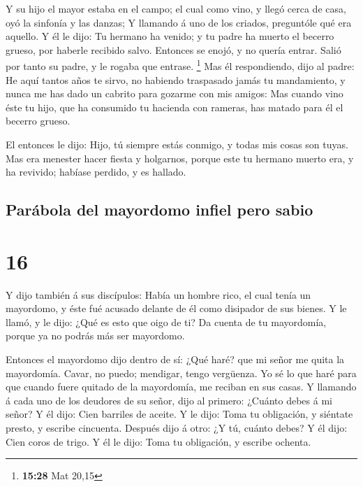  Y su hijo el mayor estaba en el campo; el cual como
vino, y llegó cerca de casa, oyó la sinfonía y las danzas;
 Y llamando á uno de los criados, preguntóle qué era
aquello.  Y él le dijo: Tu hermano ha venido; y tu padre
ha muerto el becerro grueso, por haberle recibido salvo. 
Entonces se enojó, y no quería entrar. Salió por tanto su padre, y le
rogaba que entrase. \footnote{\textbf{15:28} Mat 20,15} 
Mas él respondiendo, dijo al padre: He aquí tantos años te sirvo, no
habiendo traspasado jamás tu mandamiento, y nunca me has dado un cabrito
para gozarme con mis amigos:  Mas cuando vino éste tu
hijo, que ha consumido tu hacienda con rameras, has matado para él el
becerro grueso.

 El entonces le dijo: Hijo, tú siempre estás conmigo, y
todas mis cosas son tuyas.  Mas era menester hacer fiesta
y holgarnos, porque este tu hermano muerto era, y ha revivido; habíase
perdido, y es hallado.

\hypertarget{paruxe1bola-del-mayordomo-infiel-pero-sabio}{%
\subsection{Parábola del mayordomo infiel pero
sabio}\label{paruxe1bola-del-mayordomo-infiel-pero-sabio}}

\hypertarget{section-15}{%
\section{16}\label{section-15}}

 Y dijo también á sus discípulos: Había un hombre rico, el
cual tenía un mayordomo, y éste fué acusado delante de él como disipador
de sus bienes.  Y le llamó, y le dijo: ¿Qué es esto que
oigo de ti? Da cuenta de tu mayordomía, porque ya no podrás más ser
mayordomo.

 Entonces el mayordomo dijo dentro de sí: ¿Qué haré? que
mi señor me quita la mayordomía. Cavar, no puedo; mendigar, tengo
vergüenza.  Yo sé lo que haré para que cuando fuere
quitado de la mayordomía, me reciban en sus casas.  Y
llamando á cada uno de los deudores de su señor, dijo al primero:
¿Cuánto debes á mi señor?  Y él dijo: Cien barriles de
aceite. Y le dijo: Toma tu obligación, y siéntate presto, y escribe
cincuenta.  Después dijo á otro: ¿Y tú, cuánto debes? Y él
dijo: Cien coros de trigo. Y él le dijo: Toma tu obligación, y escribe
ochenta.

